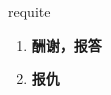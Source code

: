 
\begin{frame}
{\huge requite}
\begin{center}
\begin{enumerate}\Large
  \item \textbf{酬谢，报答}
  \item \textbf{报仇}
\end{enumerate}
\end{center}
\end{frame}
